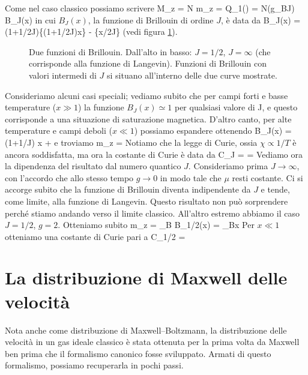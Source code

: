 \ee
Come nel caso classico possiamo scrivere
\be
M_z = N m_z = \ln Q_1(\beta)
    = N(g\mu_BJ) B_J(x)
\ee
in cui $B_J(x)$, la funzione di Brillouin di ordine $J$, è data da
\be
B_J(x) = (1+1/2J)\coth\{(1+1/2J)x\} - \coth\{x/2J\}
\ee
(vedi figura \ref{fig:brillouin}). 
\begin{figure}[h]
  \label{fig:brillouin}
  \centering
  
  \caption{Due funzioni di Brillouin. Dall'alto in basso: $J = 1/2$, $J=\infty$ (che corrisponde alla funzione di Langevin). Funzioni di Brillouin con valori intermedi di $J$ si situano all'interno delle due curve mostrate.} 
  \label{fig:brillouin}
\end{figure}
Consideriamo alcuni casi speciali; vediamo subito che per campi forti e basse temperature ($x \gg 1$) la funzione $B_J(x) \simeq 1$ per qualsiasi valore di J, e questo corrisponde a una situazione di saturazione magnetica. D'altro canto, per alte temperature e campi deboli ($x \ll 1$) possiamo espandere ottenendo
\be
B_J(x) = (1+1/J) x + \cdots
\ee
e troviamo
\be
m_z = 
\ee
Notiamo che la legge di Curie, ossia $\chi \propto 1/T$ è ancora soddisfatta, ma ora la costante di Curie è data da
\be
C_J =  = 
\ee
Vediamo ora la dipendenza del risultato dal numero quantico $J$. Consideriamo prima $J\to\infty$, con l'accordo che allo stesso tempo $g\to 0$ in modo tale che $\mu$ resti costante. Ci si accorge subito che la funzione di Brillouin diventa indipendente da $J$ e tende, come limite, alla funzione di Langevin. Questo risultato non può sorprendere perché stiamo andando verso il limite classico. All'altro estremo abbiamo il caso $J=1/2$, $g=2$. Otteniamo subito
\be
m_z = \mu_B B_{1/2}(x) = \mu_B\tanh x
\ee
Per $x\ll 1$ otteniamo una costante di Curie pari a
\be
C_{1/2} = 
\ee

\section{La distribuzione di Maxwell delle velocità}

Nota anche come distribuzione di Maxwell--Boltzmann, la distribuzione delle velocità in un gas ideale classico è stata ottenuta per la prima volta da Maxwell ben prima che il formalismo canonico fosse sviluppato. Armati di questo formalismo, possiamo recuperarla in pochi passi.

